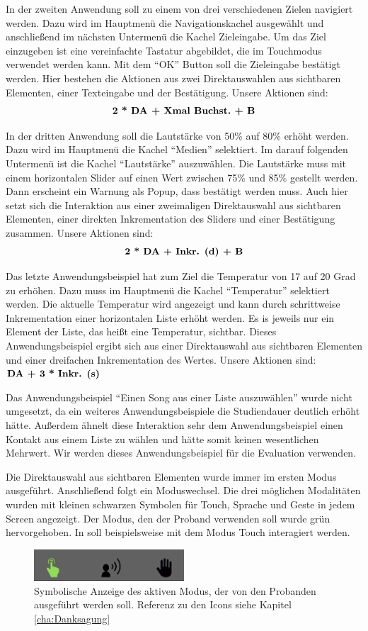 In der zweiten Anwendung soll zu einem von drei verschiedenen Zielen navigiert werden. 
Dazu wird im Hauptmenü die Navigationskachel ausgewählt und anschließend im nächsten Untermenü die Kachel Zieleingabe. 
Um das Ziel einzugeben ist eine vereinfachte Tastatur abgebildet, die im Touchmodus verwendet werden kann. 
Mit dem "`OK"' Button soll die Zieleingabe bestätigt werden. 
Hier bestehen die Aktionen aus zwei Direktauswahlen aus sichtbaren Elementen, einer Texteingabe und der Bestätigung. 
Unsere Aktionen sind:
$$\textbf{2 * \text{DA} + \text{Xmal Buchst.} + \text{B}}$$

In der dritten Anwendung soll die Lautstärke von 50\% auf 80\% erhöht werden. 
Dazu wird im Hauptmenü die Kachel "`Medien"' selektiert. 
Im darauf folgenden Untermenü ist die Kachel "`Lautstärke"' auszuwählen. 
Die Lautstärke muss mit einem horizontalen Slider auf einen Wert zwischen 75\% und 85\% gestellt werden. 
Dann erscheint ein Warnung als Popup, dass bestätigt werden muss. 
Auch hier setzt sich die Interaktion aus einer zweimaligen Direktauswahl aus sichtbaren Elementen, einer direkten Inkrementation des Sliders und einer Bestätigung zusammen.
Unsere Aktionen sind:
$$\textbf{2 * \text{DA} + \text{Inkr. (d)} + \text{B}}$$

Das letzte Anwendungsbeispiel hat zum Ziel die Temperatur von 17 auf 20 Grad zu erhöhen. 
Dazu muss im Hauptmenü die Kachel "`Temperatur"' selektiert werden. 
Die aktuelle Temperatur wird angezeigt und kann durch schrittweise Inkrementation einer horizontalen Liste erhöht werden.
Es is jeweils nur ein Element der Liste, das heißt eine Temperatur, sichtbar.
Dieses Anwendungsbeispiel ergibt sich aus einer Direktauswahl aus sichtbaren Elementen und einer dreifachen Inkrementation des Wertes. 
Unsere Aktionen sind: $\textbf{\text{DA} + 3 * \text{Inkr. (s)}}$ 

Das Anwendungsbeispiel "`Einen Song aus einer Liste auszuwählen"' wurde nicht umgesetzt, da ein weiteres  Anwendungsbeispiele die Studiendauer deutlich erhöht hätte. 
Außerdem ähnelt diese Interaktion sehr dem Anwendungsbeispiel einen Kontakt aus einem Liste zu wählen und hätte somit keinen wesentlichen Mehrwert. 
Wir werden dieses Anwendungsbeispiel für die Evaluation verwenden.

Die Direktauswahl aus sichtbaren Elementen wurde immer im ersten Modus ausgeführt.
Anschließend folgt ein Moduswechsel. 
Die drei möglichen Modalitäten wurden mit kleinen schwarzen Symbolen für Touch, Sprache und Geste in jedem Screen angezeigt. 
Der Modus, den der Proband verwenden soll wurde grün hervorgehoben. 
In  soll beispielsweise mit dem Modus Touch interagiert werden. 
\begin{figure}[ht]
  \centering
  \includegraphics[width=0.5\textwidth]{img/ModusAktiv.jpg}
  \caption[Symbolische Anzeige des aktiven Modus]{Symbolische Anzeige des aktiven Modus, der von den Probanden ausgeführt werden soll. Referenz zu den Icons siehe Kapitel \ref{cha:Danksagung}}
  \label{fig:ModusAktiv}
\end{figure}

